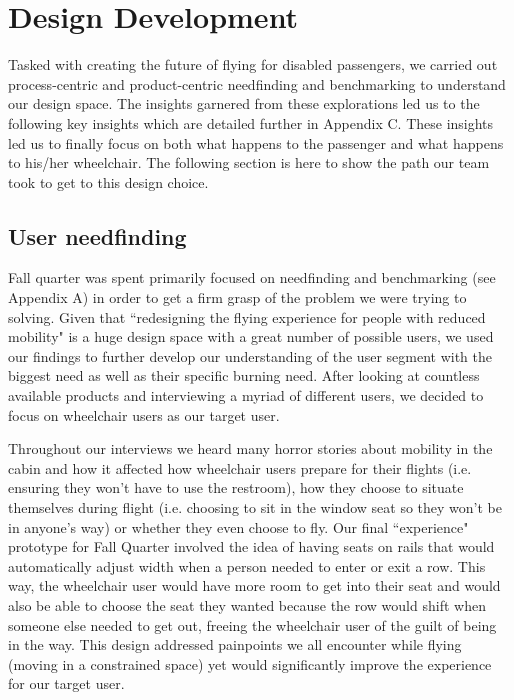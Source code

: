 \chapter{Design Development}

Tasked with creating the future of flying for disabled passengers, we carried out process-centric and product-centric needfinding and benchmarking to understand our design space. The insights garnered from these explorations led us to the following key insights which are detailed further in Appendix C.  These insights led us to finally focus on both what happens to the passenger and what happens to his/her wheelchair. The following section is here to show the path our team took to get to this design choice.

\section{User needfinding}
Fall quarter was spent primarily focused on needfinding and benchmarking (see Appendix A) in order to get a firm grasp of the problem we were trying to solving. Given that ``redesigning the flying experience for people with reduced mobility" is a huge design space with a great number of possible users, we used our findings to further develop our understanding of the user segment with the biggest need as well as their specific burning need. After looking at countless available products and interviewing a myriad of different users, we decided to focus on wheelchair users as our target user. 

Throughout our interviews we heard many horror stories about mobility in the cabin and how it affected how wheelchair users prepare for their flights (i.e. ensuring they won't have to use the restroom), how they choose to situate themselves during flight (i.e. choosing to sit in the window seat so they won't be in anyone's way) or whether they even choose to fly. Our final ``experience" prototype for Fall Quarter involved the idea of having seats on rails that would automatically adjust width when a person needed to enter or exit a row. This way, the wheelchair user would have more room to get into their seat and would also be able to choose the seat they wanted because the row would shift when someone else needed to get out, freeing the wheelchair user of the guilt of being in the way. This design addressed painpoints we all encounter while flying (moving in a constrained space) yet would significantly improve the experience for our target user. \\

